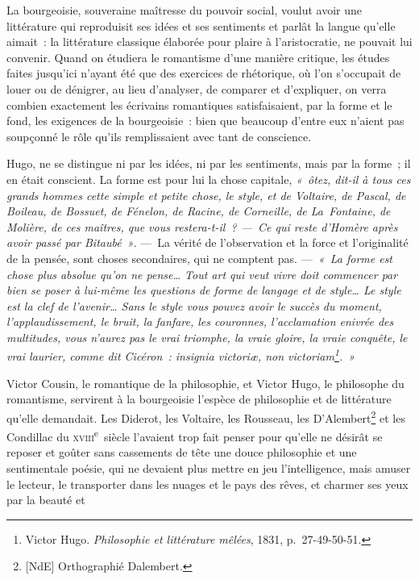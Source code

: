 \documentclass[french,twoside]{book} %
\begin{document}
La bourgeoisie, souveraine maîtresse du pouvoir social, voulut avoir une littérature qui reproduisit ses idées et ses sentiments et parlât la langue qu’elle aimait : la littérature classique élaborée pour plaire à l’aristocratie, ne pouvait lui convenir. Quand on étudiera le romantisme d’une manière critique, les études faites jusqu’ici n’ayant été que des exercices de rhétorique, où l’on s’occupait de louer ou de dénigrer, au lieu d’analyser, de comparer et d’expliquer, on verra combien exactement les écrivains romantiques satisfaisaient, par la forme et le fond, les exigences de la bourgeoisie : bien que beaucoup d’entre eux n’aient pas soupçonné le rôle qu’ils remplissaient avec tant de conscience.\par
Hugo, ne se distingue ni par les idées, ni par les sentiments, mais par la forme ; il en était conscient.  
\label{p53}La forme est pour lui la chose capitale, \emph{« ôtez, dit-il à tous ces grands hommes cette simple et petite chose, le style, et de Voltaire, de Pascal, de Boileau, de Bossuet, de Fénelon, de Racine, de Corneille, de La Fontaine, de Molière, de ces maîtres, que vous restera-t-il ? — Ce qui reste d’Homère après avoir passé par Bitaubé »}. — La vérité de l’observation et la force et l’originalité de la pensée, sont choses secondaires, qui ne comptent pas. — \emph{« La forme est chose plus absolue qu’on ne pense… Tout art qui veut vivre doit commencer par bien se poser à lui-même les questions de forme de langage et de style… Le style est la clef de l’avenir… Sans le style vous pouvez avoir le succès du moment, l’applaudissement, le bruit, la fanfare, les couronnes, l’acclamation enivrée des multitudes, vous n’aurez pas le vrai triomphe, la vraie gloire, la vraie conquête, le vrai laurier, comme dit Cicéron : {\itshape insignia victoriæ, non victoriam}\footnote{Victor Hugo. \emph{Philosophie et littérature mêlées}, 1831, p. 27-49-50-51.}. »}\par
Victor Cousin, le romantique de la philosophie, et Victor Hugo, le philosophe du romantisme, servirent à la bourgeoisie l’espèce de philosophie et de littérature qu’elle demandait. Les Diderot, les Voltaire, les Rousseau, les D’Alembert\footnote{[NdE] Orthographié Dalembert.} et les Condillac du \textsc{xviii}\textsuperscript{e} siècle l’avaient trop fait penser pour qu’elle ne désirât se reposer et goûter sans cassements de tête une douce philosophie et une sentimentale poésie, qui ne devaient plus mettre en jeu l’intelligence, mais amuser le lecteur, le transporter dans les nuages et le pays des rêves, et charmer ses yeux par la beauté et  
\end{document}
